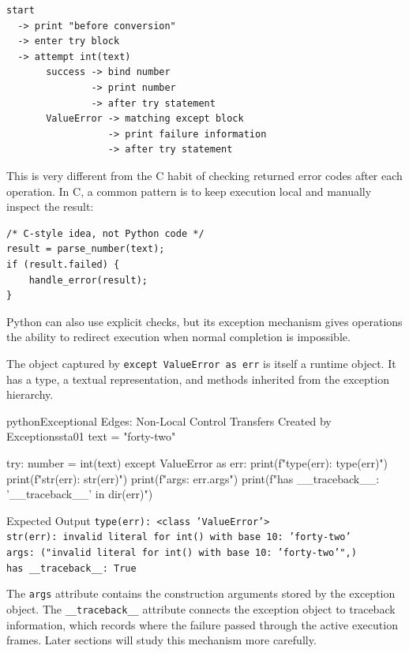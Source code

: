 \documentclass[a4paper,twoside]{report}
\begin{document}
\begin{verbatim}
start
  -> print "before conversion"
  -> enter try block
  -> attempt int(text)
       success -> bind number
               -> print number
               -> after try statement
       ValueError -> matching except block
                  -> print failure information
                  -> after try statement
\end{verbatim}

This is very different from the C habit of checking returned error codes after each operation. In C, a common pattern is to keep execution local and manually inspect the result:

\begin{verbatim}
/* C-style idea, not Python code */
result = parse_number(text);
if (result.failed) {
    handle_error(result);
}
\end{verbatim}

Python can also use explicit checks, but its exception mechanism gives operations the ability to redirect execution when normal completion is impossible.

The object captured by \texttt{except ValueError as err} is itself a runtime object. It has a type, a textual representation, and methods inherited from the exception hierarchy.

\begin{codebox}[]{python}{Exceptional Edges: Non-Local Control Transfers Created by Exceptions}{sta01}
text = "forty-two"

try:
    number = int(text)
except ValueError as err:
    print(f"type(err): {type(err)}")
    print(f"str(err): {str(err)}")
    print(f"args: {err.args}")
    print(f"has __traceback__: {'__traceback__' in dir(err)}")
\end{codebox}


\begin{iobox}{Expected Output}
\texttt{type(err): <class 'ValueError'>} \\
\texttt{str(err): invalid literal for int() with base 10: 'forty-two'} \\
\texttt{args: ("invalid literal for int() with base 10: 'forty-two'",)} \\
\texttt{has \_\_traceback\_\_: True} \\
\end{iobox}


The \texttt{args} attribute contains the construction arguments stored by the exception object. The \texttt{\_\_traceback\_\_} attribute connects the exception object to traceback information, which records where the failure passed through the active execution frames. Later sections will study this mechanism more carefully.
\end{document}
